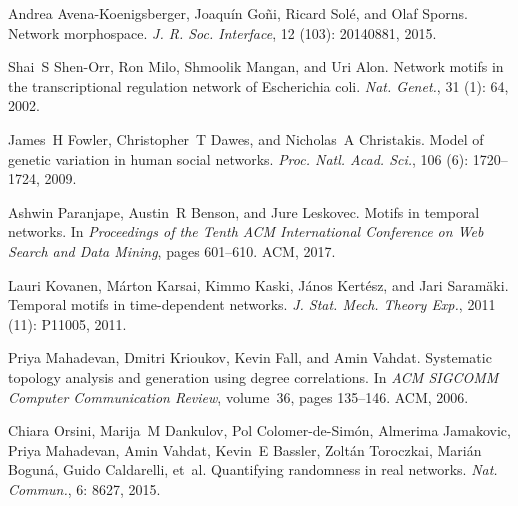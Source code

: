 Andrea {Avena-Koenigsberger}, Joaqu{\'i}n Go{\~n}i, Ricard Sol{\'e}, and Olaf
Sporns.
\newblock Network morphospace.
\newblock \emph{J. R. Soc. Interface}, 12 (103): 20140881,
2015.

Shai~S {Shen-Orr}, Ron Milo, Shmoolik Mangan, and Uri Alon.
\newblock Network motifs in the transcriptional regulation network of
{{Escherichia}} coli.
\newblock \emph{Nat. Genet.}, 31 (1): 64, 2002.

James~H Fowler, Christopher~T Dawes, and Nicholas~A Christakis.
\newblock Model of genetic variation in human social networks.
\newblock \emph{Proc. Natl. Acad. Sci.}, 106 (6): 1720--1724,
2009.

Ashwin Paranjape, Austin~R Benson, and Jure Leskovec.
\newblock Motifs in temporal networks.
\newblock In \emph{Proceedings of the Tenth {{ACM}} International Conference on
    Web Search and Data Mining}, pages 601--610. {ACM}, 2017.

Lauri Kovanen, M{\'a}rton Karsai, Kimmo Kaski, J{\'a}nos Kert{\'e}sz, and Jari
Saram{\"a}ki.
\newblock Temporal motifs in time-dependent networks.
\newblock \emph{J. Stat. Mech. Theory Exp.}, 2011 (11):
P11005, 2011.

Priya Mahadevan, Dmitri Krioukov, Kevin Fall, and Amin Vahdat.
\newblock Systematic topology analysis and generation using degree
correlations.
\newblock In \emph{{{ACM SIGCOMM}} Computer Communication Review}, volume~36,
pages 135--146. {ACM}, 2006.

Chiara Orsini, Marija~M Dankulov, Pol {Colomer-de-Sim{\'o}n}, Almerima
Jamakovic, Priya Mahadevan, Amin Vahdat, Kevin~E Bassler, Zolt{\'a}n
Toroczkai, Mari{\'a}n Bogun{\'a}, Guido Caldarelli, et~al.
\newblock Quantifying randomness in real networks.
\newblock \emph{Nat. Commun.}, 6: 8627, 2015.

